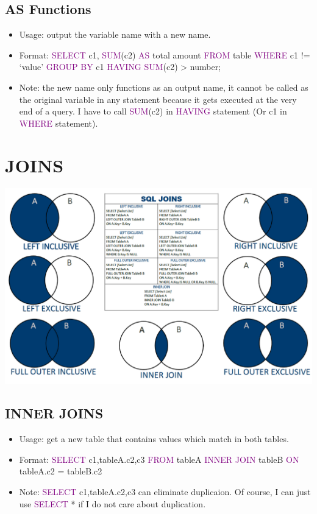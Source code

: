 \documentclass[a4paper]{article}
\begin{document}
\subsection{AS Functions}
\begin{itemize}
  \item Usage: output the variable name with a new name.
  \item Format: \textcolor{purple}{SELECT} c1, \textcolor{purple}{SUM}(c2) \textcolor{purple}{AS} total amount \textcolor{purple}{FROM} table \textcolor{purple}{WHERE} c1 != `value' \textcolor{purple}{GROUP BY} c1 \textcolor{purple}{HAVING} \textcolor{purple}{SUM}(c2) > number;
  \item Note: the new name only functions as an output name, it cannot be called as the original variable in any statement because it gets executed at the very end of a query. I have to call \textcolor{purple}{SUM}(c2) in \textcolor{purple}{HAVING} statement (Or c1 in \textcolor{purple}{WHERE} statement).
\end{itemize}

\section{JOINS}
\includegraphics[scale=0.43]{joins.png}
\subsection{INNER JOINS}
\begin{itemize}
  \item Usage: get a new table that contains values which match in both tables.
  \item Format: \textcolor{purple}{SELECT} c1,tableA.c2,c3 \textcolor{purple}{FROM} tableA \textcolor{purple}{INNER JOIN} tableB \textcolor{purple}{ON} tableA.c2 = tableB.c2
  \item Note:  \textcolor{purple}{SELECT} c1,tableA.c2,c3 can eliminate duplicaion. Of course, I can just use \textcolor{purple}{SELECT} * if I do not care about duplication.
\end{itemize}
\end{document}
